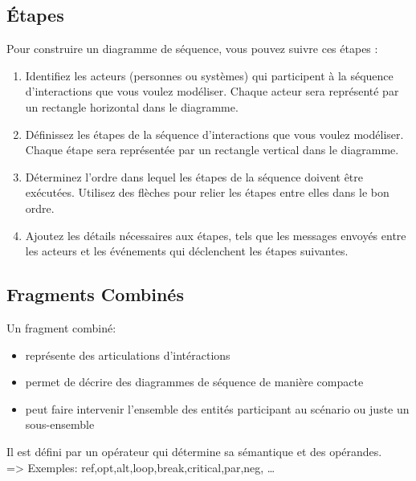 \subsection{Étapes}
Pour construire un diagramme de séquence, vous pouvez suivre ces étapes :
\begin{enumerate}
\item Identifiez les acteurs (personnes ou systèmes) qui participent à la séquence d'interactions que vous voulez modéliser. Chaque acteur sera représenté par un rectangle horizontal dans le diagramme.
\item Définissez les étapes de la séquence d'interactions que vous voulez modéliser. Chaque étape sera représentée par un rectangle vertical dans le diagramme.
\item Déterminez l'ordre dans lequel les étapes de la séquence doivent être exécutées. Utilisez des flèches pour relier les étapes entre elles dans le bon ordre.
\item Ajoutez les détails nécessaires aux étapes, tels que les messages envoyés entre les acteurs et les événements qui déclenchent les étapes suivantes.
\end{enumerate}


\subsection{Fragments Combinés}
\begin{definition}
Un fragment combiné:
\begin{itemize}
\item représente des articulations d'intéractions
\item permet de décrire des diagrammes de séquence de
manière compacte
\item peut faire intervenir l'ensemble des entités participant
au scénario ou juste un sous-ensemble
\end{itemize}
Il est défini par un opérateur qui détermine sa sémantique et des opérandes.\\
=> Exemples: ref,opt,alt,loop,break,critical,par,neg, \dots
\end{definition}


